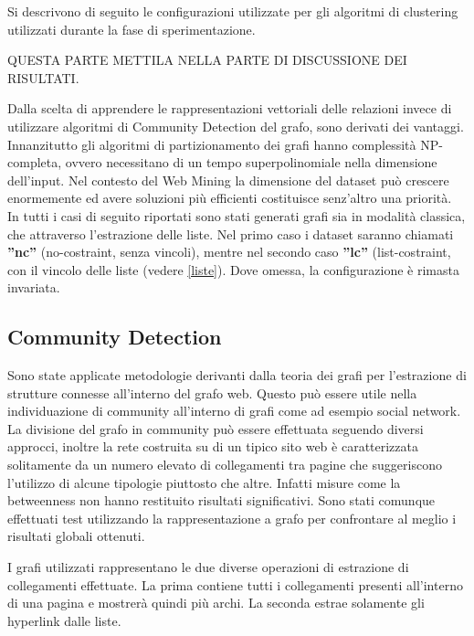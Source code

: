 









Si descrivono di seguito le configurazioni utilizzate per gli algoritmi di clustering utilizzati durante la fase di sperimentazione. 
\color{red}

QUESTA PARTE METTILA NELLA PARTE DI DISCUSSIONE DEI RISULTATI.

Dalla scelta di apprendere le rappresentazioni vettoriali delle relazioni invece di utilizzare algoritmi di Community Detection del grafo, sono derivati dei vantaggi. Innanzitutto gli algoritmi di partizionamento dei grafi hanno complessità NP-completa, ovvero necessitano di un tempo superpolinomiale nella dimensione dell'input. Nel contesto del Web Mining la dimensione del dataset può crescere enormemente ed avere soluzioni più efficienti costituisce senz'altro una priorità. 
\\
In tutti i casi di seguito riportati sono stati generati grafi sia in modalità classica, che attraverso l'estrazione delle liste. Nel primo caso i dataset saranno chiamati \textbf{''nc''} (no-costraint, senza vincoli), mentre nel secondo caso \textbf{''lc''} (list-costraint, con il vincolo delle liste (vedere \ref{liste}). Dove omessa, la configurazione è rimasta invariata.
\color{black}
\subsection{Community Detection}
Sono state applicate metodologie derivanti dalla teoria dei grafi per l'estrazione di strutture connesse all'interno del grafo web. Questo può essere utile nella individuazione di community all'interno di grafi come ad esempio social network. La divisione del grafo in community può essere effettuata seguendo diversi approcci, inoltre la rete costruita su di un tipico sito web è caratterizzata solitamente da un numero elevato di collegamenti tra pagine che suggeriscono l'utilizzo di alcune tipologie piuttosto che altre. Infatti misure come la betweenness non hanno restituito risultati significativi.
Sono stati comunque effettuati test utilizzando la rappresentazione a grafo per confrontare al meglio i risultati globali ottenuti.


I grafi utilizzati rappresentano le due diverse operazioni di estrazione di collegamenti effettuate. La prima contiene tutti i collegamenti presenti all'interno di una pagina e mostrerà quindi più archi. La seconda estrae solamente gli hyperlink dalle liste.

